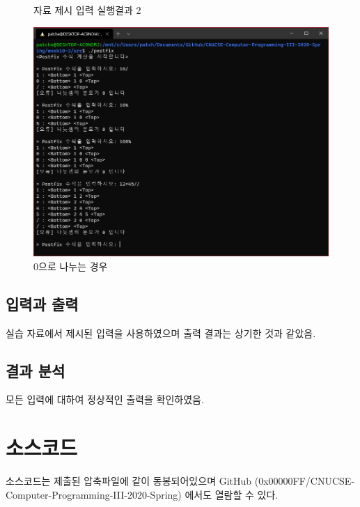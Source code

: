 \documentclass[UTF8]{report}
\begin{document}
{\begin{figure}[!htb]
                \caption{자료 제시 입력 실행결과 2}
                \label{}
            \end{figure}
            \begin{figure}[!htb]
                \centering
                \includegraphics[width=\textwidth]{result_3.png}
                \caption{0으로 나누는 경우}
                \label{}
            \end{figure}
        }

        \newpage

        \section{입력과 출력}
            실습 자료에서 제시된 입력을 사용하였으며 출력 결과는 상기한 것과 같았음.
        \section{결과 분석}
            모든 입력에 대하여 정상적인 출력을 확인하였음.

    \chapter{소스코드}
        소스코드는 제출된 압축파일에 같이 동봉되어있으며 GitHub (0x00000FF/CNUCSE-Computer-Programming-III-2020-Spring) 에서도 열람할 수 있다.
\end{document}
